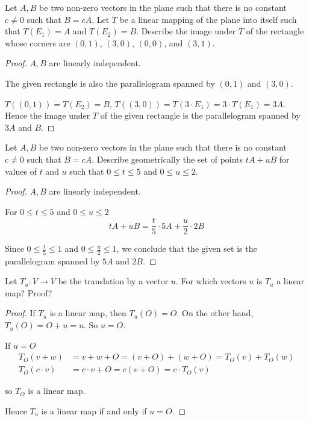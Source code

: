 \begin{exercise}
    Let $A, B$ be two non-zero vectors in the plane such that there is no constant $c\ne 0$ such that $B = cA$. Let $T$ be a linear mapping of the plane into itself such that $T(E_{1}) = A$ and $T(E_{2}) = B$. Describe the image under $T$ of the rectangle whose corners are $(0, 1)$, $(3, 0)$, $(0, 0)$, and $(3, 1)$.
\end{exercise}

\begin{proof}
    $A, B$ are linearly independent.

    The given rectangle is also the parallelogram spanned by $(0, 1)$ and $(3, 0)$.

    $T((0, 1)) = T(E_{2}) = B$, $T((3, 0)) = T(3\cdot E_{1}) = 3\cdot T(E_{1}) = 3A$. Hence the image under $T$ of the given rectangle is the parallelogram spanned by $3A$ and $B$.
\end{proof}

\begin{exercise}
    Let $A, B$ be two non-zero vectors in the plane such that there is no constant $c\ne 0$ such that $B = cA$. Describe geometrically the set of points $tA + uB$ for values of $t$ and $u$ such that $0 \leq t \leq 5$ and $0 \leq u \leq 2$.
\end{exercise}

\begin{proof}
    $A, B$ are linearly independent.

    For $0\leq t\leq 5$ and $0\leq u\leq 2$
    \[
        tA + uB = \frac{t}{5}\cdot 5A + \frac{u}{2}\cdot 2B
    \]

    Since $0\leq \frac{t}{5} \leq 1$ and $0 \leq \frac{u}{2} \leq 1$, we conclude that the given set is the parallelogram spanned by $5A$ and $2B$.
\end{proof}

\begin{exercise}
    Let $T_{u}: V \to V$ be the translation by a vector $u$. For which vectors $u$ is $T_{u}$ a linear map? Proof?
\end{exercise}

\begin{proof}
    If $T_{u}$ is a linear map, then $T_{u}(O) = O$. On the other hand, $T_{u}(O) = O + u = u$. So $u = O$.

    If $u = O$
    \begin{align*}
        T_{O}(v + w)    & = v + w + O = (v + O) + (w + O) = T_{O}(v) + T_{O}(w) \\
        T_{O}(c\cdot v) & = c\cdot v + O = c(v + O) = c\cdot T_{O}(v)
    \end{align*}

    so $T_{O}$ is a linear map.

    Hence $T_{u}$ is a linear map if and only if $u = O$.
\end{proof}

